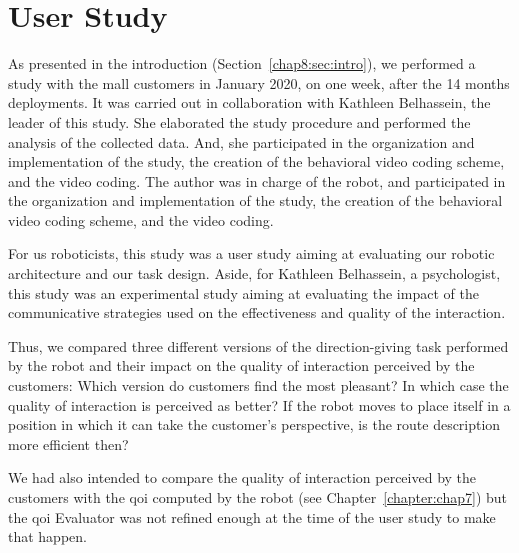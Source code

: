 \documentclass[a4paper,11pt,twoside]{StyleThese}
\begin{document}
\section{User Study}\label{chap8:sec:us}

As presented in the introduction (Section~\ref{chap8:sec:intro}), we performed a study with the mall customers in January 2020, on one week, after the 14 months deployments. It was carried out in collaboration with Kathleen Belhassein, the leader of this study. She elaborated the study procedure and performed the analysis of the collected data. And, she participated in the organization and implementation of the study, the creation of the behavioral video coding scheme, and the video coding. The author was in charge of the robot, and participated in the organization and implementation of the study, the creation of the behavioral video coding scheme, and the video coding. 

For us roboticists, this study was a user study aiming at evaluating our robotic architecture and our task design. Aside, for Kathleen Belhassein, a psychologist, this study was an experimental study aiming at evaluating the impact of the communicative strategies used on the effectiveness and quality of the interaction.

Thus, we compared three different versions of the direction-giving task performed by the robot and their impact on the quality of interaction perceived by the customers: Which version do customers find the most pleasant? In which case the quality of interaction is perceived as better? If the robot moves to place itself in a position in which it can take the customer's perspective, is the route description more efficient then? 

We had also intended to compare the quality of interaction perceived by the customers with the \acrshort{qoi} computed by the robot (see Chapter~\ref{chapter:chap7}) but the \acrshort{qoi} Evaluator was not refined enough at the time of the user study to make that happen.
\end{document}
